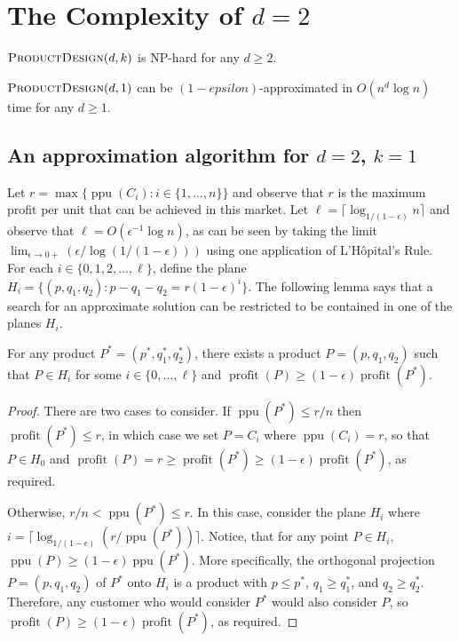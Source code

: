 \documentclass[lotsofwhite]{patmorin}
\newcommand{\ppu}{\operatorname{ppu}}
\newcommand{\val}{\operatorname{profit}}
\begin{document}
\section{The Complexity of $d=2$}

\begin{thm}
  $\textsc{ProductDesign}(d,k)$ is NP-hard for any $d\ge 2$.
\end{thm}

\begin{thm}
  $\textsc{ProductDesign}(d,1)$ can be $(1-epsilon)$-approximated in
  $O(n^d\log n)$ time for any $d\ge 1$.
\end{thm}

\subsection{An approximation algorithm for $d=2$, $k=1$}

Let $r=\max\{\ppu(C_i) : i\in\{1,\ldots, n\}\}$ and observe that $r$
is the maximum profit per unit that can be achieved in this market.
Let $\ell = \lceil\log_{1/(1-\epsilon)} n\rceil$ and observe that
$\ell = O(\epsilon^{-1}\log n)$, as can be seen by taking the limit
$\lim_{\epsilon\rightarrow 0+} (\epsilon/\log(1/(1-\epsilon)))$ using one
application of L'H\^opital's Rule. For each $i\in\{0,1,2,\ldots,\ell\}$,
define the plane $H_i = \{ (p,q_1,q_2) : p-q_1-q_2 = r(1-\epsilon)^i \}$.
The following lemma says that a search for an approximate solution can
be restricted to be contained in one of the planes $H_i$.

\begin{lem}
  For any product $P^*=(p^*,q_1^*,q_2^*)$, there exists a product
  $P=(p,q_1,q_2)$ such that $P\in H_i$ for some $i\in\{0,\ldots,\ell\}$
  and $\val(P) \ge (1-\epsilon)\val(P^*)$.
\end{lem}

\begin{proof}
  There are two cases to consider.  If $\ppu(P^*) \le r/n$ then $\val(P^*)
  \le r$, in which case we set $P=C_i$ where $\ppu(C_i) = r$, so that
  $P\in H_0$ and $\val(P) = r \ge \val(P^*)\ge (1-\epsilon)\val(P^*)$,
  as required.

  Otherwise, $r/n < \ppu(P^*) \le r$.  In this case, consider
  the plane $H_i$ where $i = \lceil\log_{1/(1-\epsilon)}
  (r/\ppu(P^*))\rceil$.  Notice, that for any point $P\in H_i$, $\ppu(P)
  \ge (1-\epsilon)\ppu(P^*)$.  More specifically, the orthogonal
  projection $P=(p,q_1,q_2)$ of $P^*$ onto $H_i$ is a product with $p\le
  p^*$, $q_1\ge q_1^*$, and $q_2\ge q_2^*$.  Therefore, any customer
  who would consider $P^*$ would also consider $P$, so $\val(P) \ge
  (1-\epsilon)\val(P^*)$, as required.
\end{proof}
\end{document}
